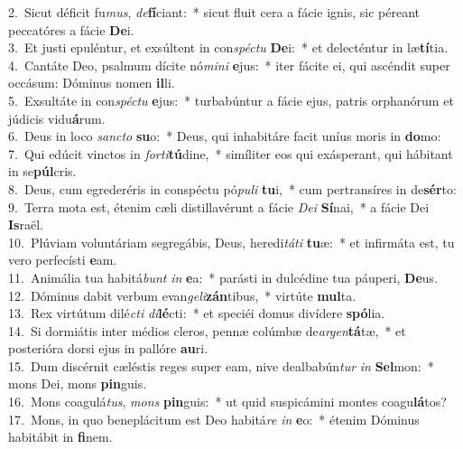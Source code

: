 {2.~}Sicut déficit fu\textit{mus}, \textit{de}\textbf{fí}ciant:~* sicut fluit cera a fácie ignis, sic péreant peccatóres a fácie \textbf{De}i.\\
{3.~}Et justi epuléntur, et exsúltent in con\textit{spé}\textit{ctu} \textbf{De}i:~* et delecténtur in læ\textbf{tí}tia.\\
{4.~}Cantáte Deo, psalmum dícite nó\textit{mi}\textit{ni} \textbf{e}jus:~* iter fácite ei, qui ascéndit super occásum: Dóminus nomen \textbf{il}li.\\
{5.~}Exsultáte in con\textit{spé}\textit{ctu} \textbf{e}jus:~* turbabúntur a fácie ejus, patris orphanórum et júdicis vidu\textbf{á}rum.\\
{6.~}Deus in loco \textit{san}\textit{cto} \textbf{su}o:~* Deus, qui inhabitáre facit uníus moris in \textbf{do}mo:\\
{7.~}Qui edúcit vinctos in \textit{for}\textit{ti}\textbf{tú}dine,~* simíliter eos qui exásperant, qui hábitant in se\textbf{púl}cris.\\
{8.~}Deus, cum egrederéris in conspéctu pó\textit{pu}\textit{li} \textbf{tu}i,~* cum pertransíres in de\textbf{sér}to:\\
{9.~}Terra mota est, étenim cæli distillavérunt a fácie \textit{De}\textit{i} \textbf{Sí}nai,~* a fácie Dei \textbf{Is}raël.\\
{10.~}Plúviam voluntáriam segregábis, Deus, heredi\textit{tá}\textit{ti} \textbf{tu}æ:~* et infirmáta est, tu vero perfecísti \textbf{e}am.\\
{11.~}Animália tua habitá\textit{bunt} \textit{in} \textbf{e}a:~* parásti in dulcédine tua páuperi, \textbf{De}us.\\
{12.~}Dóminus dabit verbum evan\textit{ge}\textit{li}\textbf{zán}tibus,~* virtúte \textbf{mul}ta.\\
{13.~}Rex virtútum dilé\textit{cti} \textit{di}\textbf{lé}cti:~* et speciéi domus divídere \textbf{spó}lia.\\
{14.~}Si dormiátis inter médios cleros, pennæ colúmbæ de\textit{ar}\textit{gen}\textbf{tá}tæ,~* et posterióra dorsi ejus in pallóre \textbf{au}ri.\\
{15.~}Dum discérnit cæléstis reges super eam, nive dealbabún\textit{tur} \textit{in} \textbf{Sel}mon:~* mons Dei, mons \textbf{pin}guis.\\
{16.~}Mons coagulá\textit{tus}, \textit{mons} \textbf{pin}guis:~* ut quid suspicámini montes coagu\textbf{lá}tos?\\
{17.~}Mons, in quo beneplácitum est Deo habitá\textit{re} \textit{in} \textbf{e}o:~* étenim Dóminus habitábit in \textbf{fi}nem.\\
